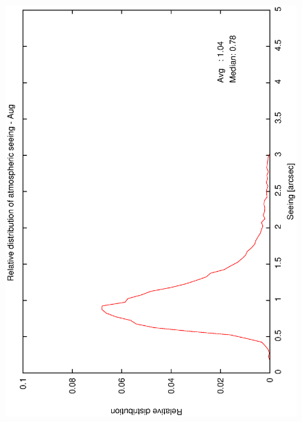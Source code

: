 {{\begin{figure}[htbp]
\begin{center}
{   \includegraphics[scale=0.25, angle=-90]{figures/ecs/corr_see_dist_aug.eps} 
   \label{fig:see_dist_aug}
  }
 \subfigure[] {
}
\end{center}
\end{figure}}}
